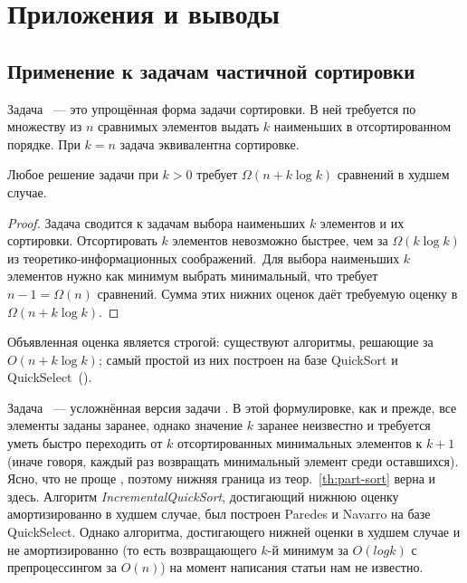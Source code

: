 \chapter{Приложения и выводы} \label{chapt3}

\section{Применение к задачам частичной сортировки}

Задача \PartSort~--- это упрощённая форма задачи сортировки.\cite{partial-sort}
В ней требуется по множеству из $n$ сравнимых элементов выдать $k$ наименьших
в отсортированном порядке. При $k=n$ задача \PartSort эквивалентна сортировке.

\begin{theorem} \label{th:part-sort}
Любое решение задачи \PartSort при $k > 0$ требует $\Omega(n + k \log k)$ сравнений
в худшем случае.
\end{theorem}
\begin{proof}
Задача \PartSort сводится к задачам выбора наименьших $k$ элементов
и их сортировки. Отсортировать $k$ элементов невозможно быстрее,
чем за $\Omega(k \log k)$ из теоретико-информационных соображений\cite[с.~222]{Cormen}.\
Для выбора наименьших
$k$ элементов нужно как минимум выбрать минимальный, что
требует $n-1 = \Omega(n)$ сравнений. Сумма этих нижних оценок даёт требуемую
оценку в $\Omega(n+k\log k)$.
\end{proof}

Объявленная оценка является строгой: существуют алгоритмы, решающие
\PartSort за $O(n + k \log k)$; самый простой из них построен на базе
QuickSort и QuickSelect~(\cite{safdsaf}).

Задача \IncSort~--- усложнённая версия задачи \PartSort. В этой формулировке,
как и прежде, все элементы заданы заранее, однако значение $k$ заранее неизвестно
и требуется уметь быстро переходить от $k$ отсортированных минимальных элементов
к $k+1$ (иначе говоря, каждый раз возвращать минимальный элемент среди
оставшихся). Ясно, что \IncSort не проще \PartSort, поэтому нижняя
граница из теор.~\ref{th:part-sort} верна и здесь.
Алгоритм \emph{IncrementalQuickSort}\cite{opt-inc-sort},
достигающий нижнюю оценку амортизированно в худшем случае,
был построен Paredes и Navarro на базе QuickSelect.
Однако алгоритма, достигающего нижней оценки в худшем случае и не амортизированно
(то есть возвращающего $k$-й минимум за $O(log k)$ с препроцессингом
за $O(n)$) на момент написания статьи нам не известно.

